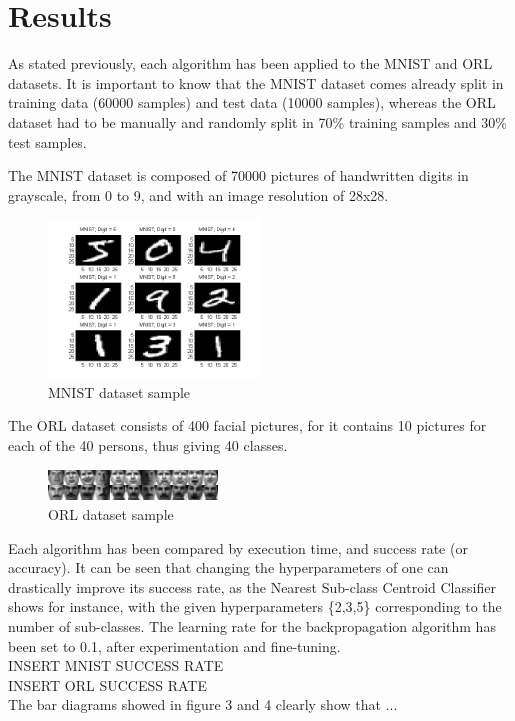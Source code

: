 \section{Results}
As stated previously, each algorithm has been applied to the MNIST and ORL datasets. It is important to know that the MNIST dataset comes already split in training data (60000 samples) and test data (10000 samples), whereas the ORL dataset had to be manually and randomly split in 70\% training samples and 30\% test samples.

The MNIST dataset is composed of 70000 pictures of handwritten digits in grayscale, from 0 to 9, and with an image resolution of 28x28.
\begin{figure}[htbp]
  \centering
      \includegraphics[width=0.5\textwidth]{fig/mnist_example.png}
  \caption{MNIST dataset sample}
\end{figure}

 The ORL dataset consists of 400 facial pictures, for it contains 10 pictures for each of the 40 persons, thus giving 40 classes.
\begin{figure}[htbp]
  \centering
  \includegraphics[width=0.4\textwidth]{fig/orl.jpg}
  \caption{ORL dataset sample}
\end{figure}

Each algorithm has been compared by execution time, and success rate (or accuracy). It can be seen that changing the hyperparameters of one can drastically improve its success rate, as the Nearest Sub-class Centroid Classifier shows for instance, with the given hyperparameters \{2,3,5\} corresponding to the number of sub-classes. The learning rate for the backpropagation algorithm has been set to 0.1, after experimentation and fine-tuning.
\\

INSERT MNIST SUCCESS RATE
\\

INSERT ORL SUCCESS RATE
\\

The bar diagrams showed in figure 3 and 4 clearly show that ...


